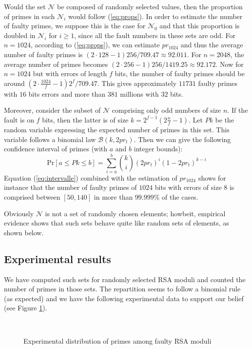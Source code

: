 \documentclass{article}
\begin{document}
Would the set ${\mathcal N}$ be composed of randomly selected values,
then the proportion of primes in each ${\mathcal N_i}$ would follow
(\ref{eq:props}). 
In order to estimate the number of faulty primes,
we suppose this is the case for ${\mathcal N_0}$ and that this
proportion is doubled in ${\mathcal N_i}$ for $i\geq1$, since all the
fault numbers in these sets are odd.
For $n=1024$, according to
(\ref{eq:props}), we can estimate $pr_{1024}$ and thus the average number of
faulty primes is $(2\cdot128-1)256/709.47 \approx 92.011$.
For $n=2048$, the average number of primes becomes
$(2\cdot256-1)256/1419.25\approx 92.172$.
Now for $n=1024$ but with errors of length $f$ bits, the number of
faulty primes should be around $(2\cdot\frac{1024}{f}-1)2^f/709.47$.
This gives approximately $11731$ faulty primes with $16$ bits errors
and more than $381$ millions with $32$ bits.


Moreover, consider the subset of ${\mathcal N}$ comprising only odd
numbers of size $n$. If the fault is on $f$ bits, then the latter is
of size $k=2^{f-1}(2\frac{n}{f}-1)$. Let $P\!k$ be the random variable expressing the expected number of primes in this set.
This variable follows a binomial law $\mathcal{B}(k,2pr_t)$. 
Then we can give the following confidence interval of primes (with $a$
and $b$ integer bounds): 
\begin{equation}\label{eq:intervalle}
\mbox{Pr}[a \leq P\!k \leq b] = \sum_{i=a}^b { k \choose i } (2pr_t)^i
(1-2pr_t)^{k-i}
\end{equation}
Equation
(\ref{eq:intervalle}) combined with the estimation of $pr_{1024}$ 
shows for instance that the number of faulty primes of $1024$ bits
with errors of size $8$ is comprised between $[50,140]$ in more than
$99.999$\% of the cases.


Obviously ${\mathcal N}$ is not a set of randomly chosen elements;
howbeit, empirical evidence shows that such sets behave quite like
random sets of elements, as shown below.

\subsection{Experimental results}
We have computed such sets for randomly selected RSA moduli and
counted the number of primes in those sets. The repartition seems to
follow a binomial rule (as expected) and we have the following experimental data to
support our belief (see Figure \ref{fig:prime_rep}).

\begin{figure}[htbp]
 \centering
 \\
 \caption{Experimental distribution of primes among faulty RSA moduli}
 \label{fig:prime_rep}
\end{figure}
\end{document}
